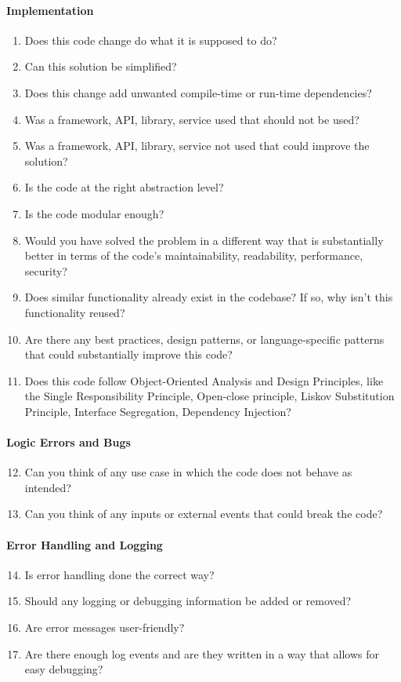 \paragraph{Implementation}
\begin{enumerate}[nosep]
    \item Does this code change do what it is supposed to do?
    \item Can this solution be simplified?
    \item Does this change add unwanted compile-time or run-time dependencies?
    \item Was a framework, API, library, service used that should not be used?
    \item Was a framework, API, library, service not used that could improve the solution?
    \item Is the code at the right abstraction level?
    \item Is the code modular enough?
    \item Would you have solved the problem in a different way that is substantially better in terms of the code’s maintainability, readability, performance, security?
    \item Does similar functionality already exist in the codebase? If so, why isn't this functionality reused?
    \item Are there any best practices, design patterns, or language-specific patterns that could substantially improve this code?
    \item Does this code follow Object-Oriented Analysis and Design Principles, like the Single Responsibility Principle, Open-close principle, Liskov Substitution Principle, Interface Segregation, Dependency Injection?
\end{enumerate}

\paragraph{Logic Errors and Bugs}
\begin{enumerate}[nosep]
  \setcounter{enumi}{11}
  \item Can you think of any use case in which the code does not behave as intended?
  \item Can you think of any inputs or external events that could break the code?
\end{enumerate}
 
\paragraph{Error Handling and Logging} 
\begin{enumerate}[nosep]
  \setcounter{enumi}{13}
  \item Is error handling done the correct way?
  \item Should any logging or debugging information be added or removed?
  \item Are error messages user-friendly?
  \item Are there enough log events and are they written in a way that allows for easy debugging?
\end{enumerate}

